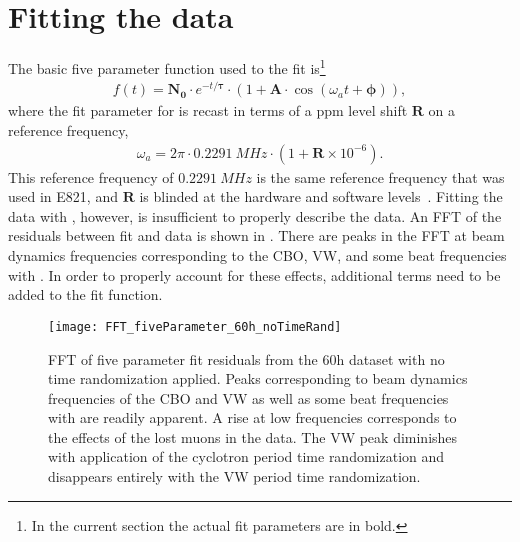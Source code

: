 \section{Fitting the data}
\label{sec:Fitting}


The basic five parameter function used to the fit is\footnote{In the current section the actual fit parameters are in bold.}
    \begin{align}
        f(t) = \boldsymbol{N_{0}} \cdot e^{-t/\boldsymbol{\tau}} \cdot (1 + \boldsymbol{A} \cdot \cos(\omega_{a}t + \boldsymbol{\phi})),
    \label{eq:fiveparfuncagain}
    \end{align}
where the fit parameter for \wa is recast in terms of a ppm level shift $\boldsymbol{R}$ on a reference frequency,
    \begin{align}
        \omega_{a} = 2 \pi \cdot \SI{0.2291}{MHz} \cdot (1 + \boldsymbol{R} \times 10^{-6}).
    \label{eq:wablind}
    \end{align}
This reference frequency of $\SI{0.2291}{MHz}$ is the same reference frequency that was used in E821, and $\boldsymbol{R}$ is blinded at the hardware and software levels~\cite{ClockManual,SoftwareBlinding}. Fitting the data with , however, is insufficient to properly describe the data. An FFT of the residuals between fit and data is shown in . There are peaks in the FFT at beam dynamics frequencies corresponding to the CBO, VW, and some beat frequencies with \wa. In order to properly account for these effects, additional terms need to be added to the fit function. 


\begin{figure}[ht]
    \centering
    \texttt{[image: FFT\_fiveParameter\_60h\_noTimeRand]}
    \caption[FFT of five parameter fit residuals]{FFT of five parameter fit residuals from the 60h dataset with no time randomization applied. Peaks corresponding to beam dynamics frequencies of the CBO and VW as well as some beat frequencies with \wa are readily apparent. A rise at low frequencies corresponds to the effects of the lost muons in the data. The VW peak diminishes with application of the cyclotron period time randomization and disappears entirely with the VW period time randomization.}
    \label{fig:FFT_fiveParameter}
\end{figure}


